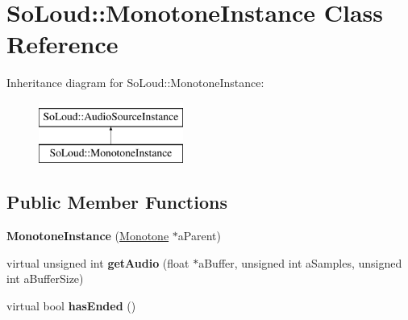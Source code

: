 \hypertarget{class_so_loud_1_1_monotone_instance}{}\section{So\+Loud\+::Monotone\+Instance Class Reference}
\label{class_so_loud_1_1_monotone_instance}
Inheritance diagram for So\+Loud\+::Monotone\+Instance\+:\begin{figure}[H]
\begin{center}
\leavevmode
\includegraphics[height=2.000000cm]{class_so_loud_1_1_monotone_instance}
\end{center}
\end{figure}
\subsection*{Public Member Functions}
\begin{DoxyCompactItemize}
\item 
\mbox{\label{class_so_loud_1_1_monotone_instance_aca1ab87876b7284b16a9dcdf57d59184}} 
{\bfseries Monotone\+Instance} (\mbox{\hyperlink{class_so_loud_1_1_monotone}{Monotone}} $\ast$a\+Parent)
\item 
\mbox{\label{class_so_loud_1_1_monotone_instance_ae64d87046332678f824ba30924e1df38}} 
virtual unsigned int {\bfseries get\+Audio} (float $\ast$a\+Buffer, unsigned int a\+Samples, unsigned int a\+Buffer\+Size)
\item 
\mbox{\label{class_so_loud_1_1_monotone_instance_aea9197bc2ed58626e2e69d5c8708bb95}} 
virtual bool {\bfseries has\+Ended} ()
\end{DoxyCompactItemize}

